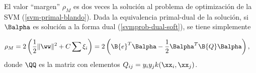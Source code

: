 El valor ``margen'' $\rho_M$ es dos veces la solución al problema de
optimización de la SVM (\autoref{svm-primal-blando}).  Dada la
equivalencia primal-dual de la solución, si $\Balpha$ es solución a
la forma dual (\autoref{svmprob-dual-soft}), se tiene simplemente

\begin{align}
\label{prieqdual}
  \rho_M &= 2\left(\frac{1}{2}\|\ww\|^2+C\sum\xi_i \right)
  =2\left(\B{e}^T\Balpha-\frac{1}{2}\Balpha^T\B{Q}\Balpha\right),
\end{align}
donde $\QQ$ es la matriz con elementos $Q_{ij}=y_iy_jk(\xx_i,\xx_j)$.

